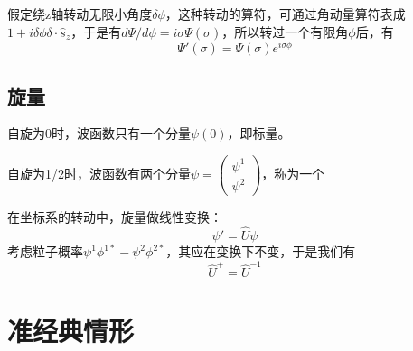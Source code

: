 \documentclass[12pt, a4paper, oneside]{ctexbook}
\newcommand{\hl}[1]{\hlbox{#1}}
\newcounter{#2}
\newcounter{#2}[#1]
\numberwithin{#2}{#1}
\begin{document}
            \begin{deduce}
              假定绕z轴转动无限小角度\(\delta\phi\)，这种转动的算符，可通过角动量算符表成\(1+i\delta\phi\delta\cdot\hat s_z\)，于是有\(d\Psi/d\phi=i\sigma\Psi(\sigma)\)，所以转过一个有限角\(\phi\)后，有 
              \begin{equation}
                \Psi'(\sigma)=\Psi(\sigma)e^{i\sigma\phi}
              \end{equation}
            \end{deduce}

            \section{旋量}
            \begin{deduce}
              自旋为0时，波函数只有一个分量\(\psi(0)\)，即标量。

              自旋为1/2时，波函数有两个分量\(\psi=\begin{pmatrix}
                \psi^1\\\psi^2
              \end{pmatrix}\)，称为一个\hl{旋量}
              
            \end{deduce}
            \begin{deduce}
              
              在坐标系的转动中，旋量做线性变换：
              \begin{equation}
                \psi'=\hat U\psi
              \end{equation}
              考虑粒子概率\(\psi^1\phi^{1*}-\psi^2\phi^{2*}\)，其应在变换下不变，于是我们有
              \begin{equation}
                \hat U^+=\hat U^{-1}
              \end{equation}
            \end{deduce}

            \chapter{准经典情形}
\end{document}
